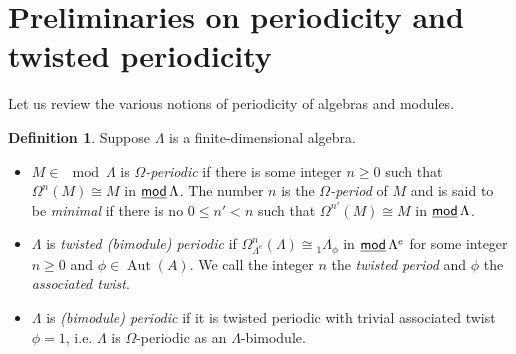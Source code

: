 \documentclass[a4paper,reqno,11pt]{amsart}
\theoremstyle{definition}
\newtheorem{definition}[theorem]{Definition}
\newcommand{\Aut}{\operatorname{Aut}\nolimits}
\newcommand{\stmod}{\mathop{\underline{\mod}}\nolimits}
\newcommand{\new}[1]{{\blue #1}}
\numberwithin{equation}{section}
\begin{document}


\section{\new{Preliminaries on periodicity and twisted periodicity}}%

Let us review the various notions of periodicity of algebras and modules.

\begin{definition} \label{def:periodic}
Suppose $\Lambda$ is a finite-dimensional algebra.
\begin{itemize}
\item $M\in \mod\Lambda$ is \emph{$\Omega$-periodic} if there is some integer $n\geq 0$ such that $\Omega^n(M)\cong M$ in $\stmod \Lambda$.  The number $n$ is the \emph{$\Omega$-period} of $M$ and is said to be \emph{minimal} if there is no $0\leq n'<n$ such that $\Omega^{n'}(M)\cong M$ in $\stmod\Lambda$.


\item $\Lambda$ is \emph{twisted (bimodule) periodic} if $\Omega_{\Lambda^e}^n(\Lambda)\cong {}_1\Lambda_\phi$ in $\stmod \Lambda^e$ for some integer $n\geq 0$ and $\phi\in \Aut(A)$.  We call the integer $n$ the \emph{twisted period} and $\phi$ the \emph{associated twist}.

\item $\Lambda$ is \emph{(bimodule) periodic} if it is twisted periodic with trivial associated twist $\phi=1$, i.e. $\Lambda$ is $\Omega$-periodic as an $\Lambda$-bimodule.
\end{itemize}
\end{definition}
\end{document}
